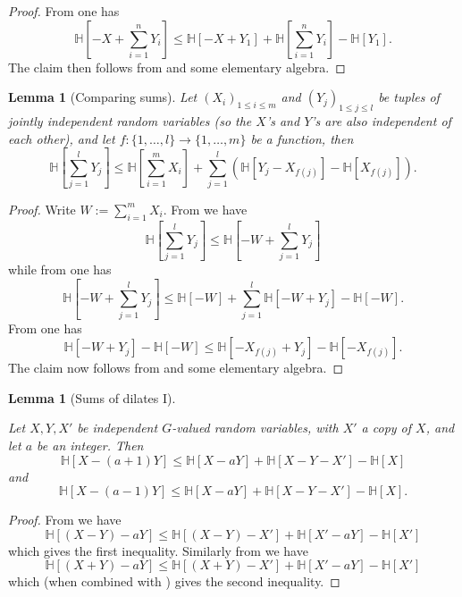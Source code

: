 \documentclass[10pt,a4paper]{article}
\newtheorem{lemma}[theorem]{Lemma}
\newcommand{\lean}[1]{}
\newcommand{\uses}[1]{}
\newcommand{\leanok}{}
\newcommand{\bbH}{\mathbb{H}}
\begin{document}
\begin{proof}\uses{kv, ruz-indep}\leanok
  From  one has
  $$ \bbH\left[-X + \sum_{i=1}^n Y_i\right] \leq \bbH[ - X + Y_1 ] + \bbH\left[ \sum_{i=1}^n Y_i \right] - \bbH[Y_1].$$
  The claim then follows from  and some elementary algebra.
\end{proof}

\begin{lemma}[Comparing sums]\label{compare-sums}\lean{ent_of_sum_le_ent_of_sum}\leanok  Let $(X_i)_{1 \leq i \leq m}$ and $(Y_j)_{1 \leq j \leq l}$ be tuples of jointly independent random variables (so the $X$'s and $Y$'s are also independent of each other), and let $f: \{1,\dots,l\} \to \{1,\dots,m\}$ be a function, then
  $$ \bbH[\sum_{j=1}^l Y_j] \leq \bbH[ \sum_{i=1}^m X_i ] + \sum_{j=1}^l (\bbH[ Y_j - X_{f(j)}] - \bbH[X_{f(j)}]).$$
\end{lemma}

\begin{proof}\uses{klm-1, kv, neg-ent, sumset-lower}\leanok  Write $W := \sum_{i=1}^m X_i$.  From  we have
$$ \bbH[\sum_{j=1}^l Y_j]  \leq \bbH[-W + \sum_{j=1}^l Y_j]$$
while from  one has
$$ \bbH[-W + \sum_{j=1}^l Y_j] \leq \bbH[-W] + \sum_{j=1}^l \bbH[-W + Y_j] - \bbH[-W].$$
From  one has
$$ \bbH[-W + Y_j] - \bbH[-W] \leq \bbH[-X_{f(j)} + Y_j] - \bbH[-X_{f(j)}].$$
The claim now follows from  and some elementary algebra.
\end{proof}

\begin{lemma}[Sums of dilates I]
  \label{sum-dilate-I}
  \lean{ent_sub_nsmul_le, ent_of_sub_smul'}
  \leanok

  Let $X,Y,X'$ be independent $G$-valued random variables, with $X'$ a copy of $X$,
  and let $a$ be an integer.  Then
  $$\bbH[X-(a+1)Y] \leq \bbH[X-aY] + \bbH[X-Y-X'] - \bbH[X]$$
  and
  $$\bbH[X-(a-1)Y] \leq \bbH[X-aY] + \bbH[X-Y-X'] - \bbH[X].$$
\end{lemma}
\begin{proof}
  \uses{ruzsa-triangle-improved, neg-ent}
  \leanok

  From  we have
  $$ \bbH[(X-Y)-aY] \leq \bbH[(X-Y) - X'] + \bbH[X'-aY] - \bbH[X']$$
  which gives the first inequality.  Similarly from  we have
  $$ \bbH[(X+Y)-aY] \leq \bbH[(X+Y) - X'] + \bbH[X'-aY] - \bbH[X']$$
  which (when combined with ) gives the second inequality.
\end{proof}
\end{document}
